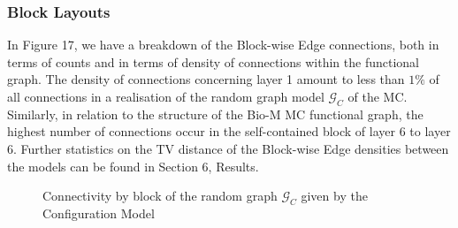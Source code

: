 \subsubsection{Block Layouts}
In Figure 17, we have a breakdown of the Block-wise Edge connections, both in terms of counts and in terms of density of connections within the functional graph. The density of connections concerning layer 1 amount to less than $1\%$ of all connections in a realisation of the random graph model $\mathcal{G}_{C}$ of the MC. Similarly, in relation to the structure of the Bio-M MC functional graph, the highest number of connections occur in the self-contained block of layer 6 to layer 6. Further statistics on the TV distance of the Block-wise Edge densities between the models can be found in Section 6, Results.

\begin{figure}[H]%
    \centering
    \captionsetup{justification=centering}
    \qquad
    \caption{Connectivity by block of the random graph $\mathcal{G}_{C}$ given by the Configuration Model}%
    \label{fig:example}%
\end{figure}
